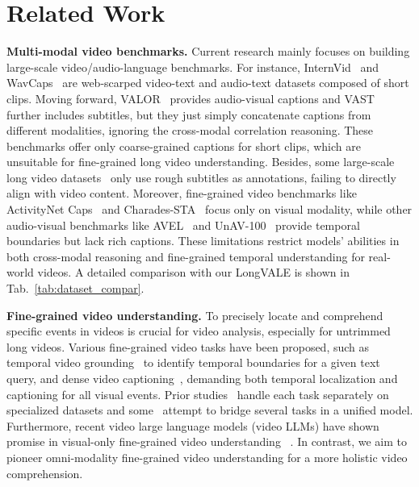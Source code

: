 \section{Related Work}
\label{sec:related_work}
\vspace{-2mm}
\noindent \textbf{Multi-modal video benchmarks.}
Current research mainly focuses on building large-scale video/audio-language benchmarks. For instance, InternVid~\cite{wang2023internvid} and WavCaps~\cite{mei2024wavcaps} are web-scarped video-text and audio-text datasets composed of short clips. Moving forward, VALOR~\cite{liu2024valor} provides audio-visual captions and VAST~\cite{chen2023vast} further includes subtitles, but they just simply concatenate captions from different modalities, ignoring the cross-modal correlation reasoning.
These benchmarks offer only coarse-grained captions for short clips, which are unsuitable for fine-grained long video understanding.
{\color{black}Besides, some large-scale long video datasets~\cite{miech2019howto100m,zellers2021merlot,xue2022advancing} only use rough subtitles as annotations, failing to directly align with video content.} 
Moreover, fine-grained video benchmarks like ActivityNet Caps~\cite{krishna2017dense} and Charades-STA~\cite{gao2017tall} focus only on visual modality, while other audio-visual benchmarks like AVEL~\cite{tian2018audio} and UnAV-100~\cite{geng2023dense} provide temporal boundaries but lack rich captions. 
These limitations restrict models' abilities in both cross-modal reasoning and fine-grained temporal understanding for real-world videos. 
A detailed comparison with our LongVALE is shown in Tab.~\ref{tab:dataset_compar}.


\noindent \textbf{Fine-grained video understanding.}
To precisely locate and comprehend specific events in videos is crucial for video analysis, especially for untrimmed long videos.
Various fine-grained video tasks have been proposed, such as temporal video grounding~\cite{gao2017tall,luo2023towards} to identify temporal boundaries for a given text query, and dense video captioning~\cite{krishna2017dense,wang2021end,yang2023vid2seq}, demanding both temporal localization and captioning for all visual events.
Prior studies~\cite{gao2017tall,luo2023towards,yang2023vid2seq} handle each task separately on specialized datasets and some~\cite{lei2021detecting,liu2022umt,lin2023univtg} attempt to bridge several tasks in a unified model. 
Furthermore, recent video large language models (video LLMs) have shown promise in visual-only fine-grained video understanding ~\cite{ren2024timechat,huang2024vtimellm}.
In contrast, we aim to pioneer omni-modality fine-grained video understanding for a more holistic video comprehension.


